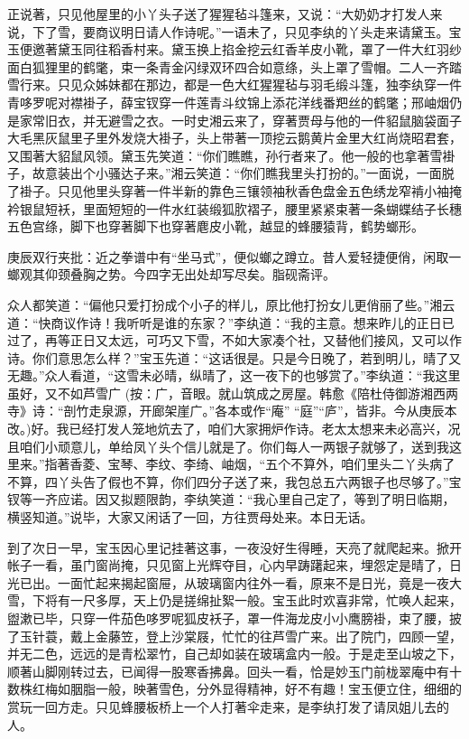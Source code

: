 \begin{parag}
    正说著，只见他屋里的小丫头子送了猩猩毡斗篷来，又说：“大奶奶才打发人来说，下了雪，要商议明日请人作诗呢。”一语未了，只见李纨的丫头走来请黛玉。宝玉便邀著黛玉同往稻香村来。黛玉换上掐金挖云红香羊皮小靴，罩了一件大红羽纱面白狐狸里的鹤氅，束一条青金闪绿双环四合如意绦，头上罩了雪帽。二人一齐踏雪行来。只见众姊妹都在那边，都是一色大红猩猩毡与羽毛缎斗篷，独李纨穿一件青哆罗呢对襟褂子，薛宝钗穿一件莲青斗纹锦上添花洋线番羓丝的鹤氅；邢岫烟仍是家常旧衣，并无避雪之衣。一时史湘云来了，穿著贾母与他的一件貂鼠脑袋面子大毛黑灰鼠里子里外发烧大褂子，头上带著一顶挖云鹅黄片金里大红尚烧昭君套，又围著大貂鼠风领。黛玉先笑道：“你们瞧瞧，孙行者来了。他一般的也拿著雪褂子，故意装出个小骚达子来。”湘云笑道：“你们瞧我里头打扮的。”一面说，一面脱了褂子。只见他里头穿著一件半新的靠色三镶领袖秋香色盘金五色绣龙窄褃小袖掩衿银鼠短袄，里面短短的一件水红装缎狐肷褶子，腰里紧紧束著一条蝴蝶结子长穗五色宫绦，脚下也穿著脚下也穿著麀皮小靴，越显的蜂腰猿背，鹤势螂形。\begin{note}庚辰双行夹批：近之拳谱中有“坐马式”，便似螂之蹲立。昔人爱轻捷便俏，闲取一螂观其仰颈叠胸之势。今四字无出处却写尽矣。脂砚斋评。\end{note}众人都笑道：“偏他只爱打扮成个小子的样儿，原比他打扮女儿更俏丽了些。”湘云道：“快商议作诗！我听听是谁的东家？”李纨道：“我的主意。想来昨儿的正日已过了，再等正日又太远，可巧又下雪，不如大家凑个社，又替他们接风，又可以作诗。你们意思怎么样？”宝玉先道：“这话很是。只是今日晚了，若到明儿，晴了又无趣。”众人看道，“这雪未必晴，纵晴了，这一夜下的也够赏了。”李纨道：“我这里虽好，又不如芦雪广 (按：广，音眼。就山筑成之房屋。韩愈《陪杜侍御游湘西两寺》诗：“剖竹走泉源，开廊架崖广。”各本或作“庵” “庭”“庐”，皆非。今从庚辰本改。)好。我已经打发人笼地炕去了，咱们大家拥炉作诗。老太太想来未必高兴，况且咱们小顽意儿，单给凤丫头个信儿就是了。你们每人一两银子就够了，送到我这里来。”指著香菱、宝琴、李纹、李绮、岫烟，“五个不算外，咱们里头二丫头病了不算，四丫头告了假也不算，你们四分子送了来，我包总五六两银子也尽够了。”宝钗等一齐应诺。因又拟题限韵，李纨笑道：“我心里自己定了，等到了明日临期，横竖知道。”说毕，大家又闲话了一回，方往贾母处来。本日无话。
\end{parag}


\begin{parag}
    到了次日一早，宝玉因心里记挂著这事，一夜没好生得睡，天亮了就爬起来。掀开帐子一看，虽门窗尚掩，只见窗上光辉夺目，心内早踌躇起来，埋怨定是晴了，日光已出。一面忙起来揭起窗屉，从玻璃窗内往外一看，原来不是日光，竟是一夜大雪，下将有一尺多厚，天上仍是搓绵扯絮一般。宝玉此时欢喜非常，忙唤人起来，盥漱已毕，只穿一件茄色哆罗呢狐皮袄子，罩一件海龙皮小小鹰膀褂，束了腰，披了玉针蓑，戴上金藤笠，登上沙棠屐，忙忙的往芦雪广来。出了院门，四顾一望，并无二色，远远的是青松翠竹，自己却如装在玻璃盒内一般。于是走至山坡之下，顺著山脚刚转过去，已闻得一股寒香拂鼻。回头一看，恰是妙玉门前栊翠庵中有十数株红梅如胭脂一般，映著雪色，分外显得精神，好不有趣！宝玉便立住，细细的赏玩一回方走。只见蜂腰板桥上一个人打著伞走来，是李纨打发了请凤姐儿去的人。
\end{parag}


